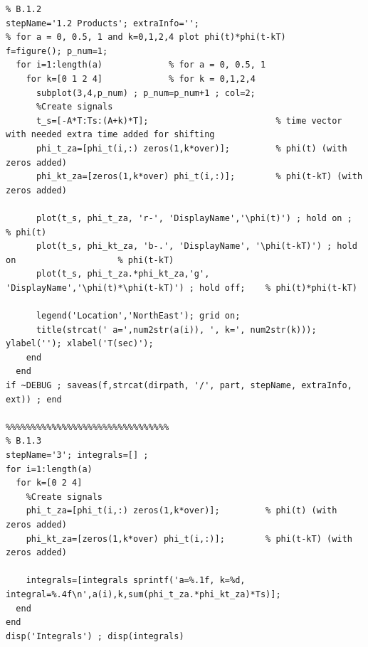 \documentclass[11pt]{article}
\begin{document}
\begin{lstlisting}[caption = {\texttt{part\_b.m}}]
%%%%%%%%%%%%%%%%%%%%%%%%%%%%%%%%
% B.1.2
stepName='1.2 Products'; extraInfo='';
% for a = 0, 0.5, 1 and k=0,1,2,4 plot phi(t)*phi(t-kT)
f=figure(); p_num=1;
  for i=1:length(a)             % for a = 0, 0.5, 1
    for k=[0 1 2 4]             % for k = 0,1,2,4
      subplot(3,4,p_num) ; p_num=p_num+1 ; col=2;
      %Create signals
      t_s=[-A*T:Ts:(A+k)*T];                         % time vector with needed extra time added for shifting
      phi_t_za=[phi_t(i,:) zeros(1,k*over)];         % phi(t) (with zeros added)
      phi_kt_za=[zeros(1,k*over) phi_t(i,:)];        % phi(t-kT) (with zeros added)
      
      plot(t_s, phi_t_za, 'r-', 'DisplayName','\phi(t)') ; hold on ;                        % phi(t) 
      plot(t_s, phi_kt_za, 'b-.', 'DisplayName', '\phi(t-kT)') ; hold on                    % phi(t-kT)
      plot(t_s, phi_t_za.*phi_kt_za,'g', 'DisplayName','\phi(t)*\phi(t-kT)') ; hold off;    % phi(t)*phi(t-kT) 
      
      legend('Location','NorthEast'); grid on;
      title(strcat(' a=',num2str(a(i)), ', k=', num2str(k))); ylabel(''); xlabel('T(sec)'); 
    end
  end
if ~DEBUG ; saveas(f,strcat(dirpath, '/', part, stepName, extraInfo, ext)) ; end

%%%%%%%%%%%%%%%%%%%%%%%%%%%%%%%%
% B.1.3
stepName='3'; integrals=[] ;
for i=1:length(a)
  for k=[0 2 4]
    %Create signals
    phi_t_za=[phi_t(i,:) zeros(1,k*over)];         % phi(t) (with zeros added)
    phi_kt_za=[zeros(1,k*over) phi_t(i,:)];        % phi(t-kT) (with zeros added)
  
    integrals=[integrals sprintf('a=%.1f, k=%d, integral=%.4f\n',a(i),k,sum(phi_t_za.*phi_kt_za)*Ts)];
  end
end
disp('Integrals') ; disp(integrals)
\end{lstlisting}
\end{document}
